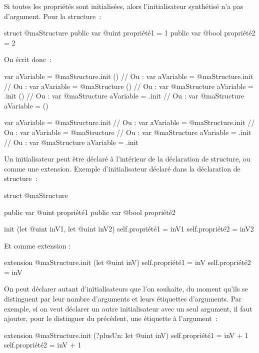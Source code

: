 Si toutes les propriétés sont initialisées, alors l'initialisateur synthétisé n'a pas d'argument. Pour la structure~:
\begin{galgas34}
struct @maStructure {
  public var @uint propriété1 = 1
  public var @bool propriété2 = 2
}
\end{galgas34}

On écrit donc~:
\begin{galgas34}
var aVariable = @maStructure.init ()
// Ou :
var aVariable = @maStructure.init
// Ou :
var aVariable = @maStructure ()
// Ou :
var @maStructure aVariable = .init ()
// Ou :
var @maStructure aVariable = .init
// Ou :
var @maStructure aVariable = ()
\end{galgas34}
\begin{galgas3}
var aVariable = @maStructure.init {}
// Ou :
var aVariable = @maStructure.init
// Ou :
var aVariable = @maStructure {}
// Ou :
var @maStructure aVariable = .init {}
// Ou :
var @maStructure aVariable = .init
\end{galgas3}








Un initialisateur peut être déclaré à l'intérieur de la déclaration de structure, ou comme une extension. Exemple d'initialisateur déclaré dans la déclaration de structure~:

\begin{galgas34}
struct @maStructure {
  public var @uint propriété1
  public var @bool propriété2
  
  init (let @uint inV1, let @uint inV2) {
    self.propriété1 = inV1
    self.propriété2 = inV2
  }
}
\end{galgas34}

Et comme extension :

\begin{galgas34}
extension @maStructure.init (let @uint inV) {
  self.propriété1 = inV
  self.propriété2 = inV
}
\end{galgas34}

On peut déclarer autant d'initialisateurs que l'on souhaite, du moment qu'ils se distinguent par leur nombre d'arguments et leurs étiquettes d'arguments. Par exemple, si on veut déclarer un autre initialisateur avec un seul argument, il faut ajouter, pour le distinguer du précédent, une étiquette à l'argument~:
\begin{galgas34}
extension @maStructure.init (?plusUn: let @uint inV) {
  self.propriété1 = inV + 1
  self.propriété2 = inV + 1
}
\end{galgas34}

